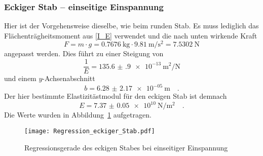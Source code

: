 \subsubsection{Eckiger Stab -- einseitige Einspannung}
Hier ist der Vorgehensweise dieselbe, wie beim runden Stab. Es muss lediglich das Flächenträgheitsmoment aus \eqref{I_E} verwendet und die nach unten wirkende Kraft
\begin{equation}
  F = m \cdot g = \SI{0.7676}{\kilo\gram} \cdot \SI{9.81}{\metre\per\second\squared} = \SI{7.5302}{\newton}
\end{equation}
angepasst werden.
Dies führt zu einer Steigung von
\begin{equation}
  \frac{1}{E}= \SI{135.6(9)e-13}{\metre\squared\per\newton}
\end{equation}
und einem $y$-Achsenabschnitt
\begin{equation}
  b = \SI{6.28(217)e-05}{\metre} \quad.
\end{equation}
Der hier bestimmte Elastizitästmodul für den eckigen Stab ist demnach
\begin{equation}
  E = \SI{7.37(5)e+10}{\newton\per\metre\squared} \quad.
\end{equation}
Die Werte wurden in Abbildung~\ref{fig:Regression_eckiger_Stab} aufgetragen.

\begin{figure}[h!]
\centering
\texttt{[image: Regression\_eckiger\_Stab.pdf]}
\caption{Regressionsgerade des eckigen Stabes bei einseitiger Einspannung}
\label{fig:Regression_eckiger_Stab}
\end{figure}







